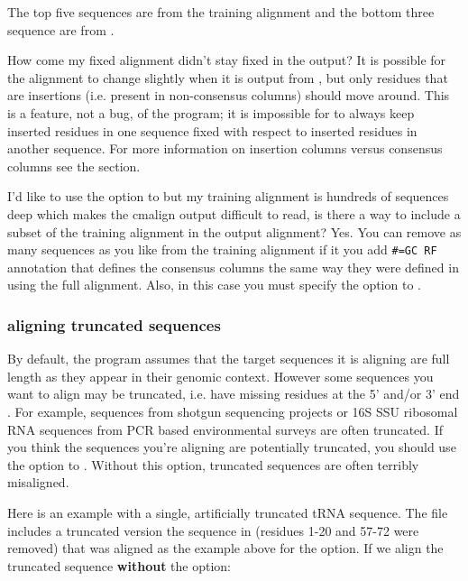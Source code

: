 The top five sequences are from the training alignment 
and the bottom three sequence are from .

\begin{srefaq}{How come my fixed alignment didn't stay fixed in the
 output?} It is possible for the  alignment
to change slightly when it is output from , but only
residues that are insertions (i.e. present in non-consensus columns)
should move around. This is a feature, not a bug, of the program; it is
impossible for  to always keep inserted residues in one sequence fixed
with respect to inserted residues in another sequence. For more
information on insertion columns versus consensus columns see the
 section.
\end{srefaq}

\begin{srefaq}{I'd like to use the  option to  
     but my training alignment is hundreds of sequences deep
    which makes the cmalign output difficult to read, is there a way
    to include a subset of the training alignment in the output
    alignment?} Yes.  You can remove as many sequences as you like
    from the training alignment if it you add {\small\verb+#=GC RF+}
    annotation that defines the consensus columns the same way they
    were defined in  using the full alignment. Also, in
    this case you must specify the  option to
    .
  \end{srefaq}

\subsubsection{aligning truncated sequences}
By default, the  program assumes that the target
sequences it is aligning are full length as they appear in their genomic
context. However some sequences you want to align may be truncated,
i.e. have missing residues at the 5' and/or 3' end . For example,
sequences from shotgun sequencing projects or 16S SSU ribosomal RNA
sequences from PCR based environmental surveys are often truncated. If
you think the sequences you're aligning are potentially truncated, you
should use the  option to . Without this
option, truncated sequences are often terribly misaligned.

Here is an example with a single, artificially truncated tRNA
sequence. The file  includes a truncated
version the sequence in  (residues 1-20 and 57-72
were removed) that was aligned as the example above for 
the  option. If we align the truncated sequence
\textbf{without} the  option: 

